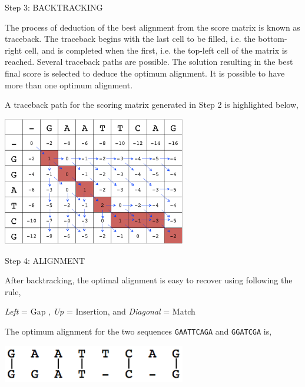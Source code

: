 \documentclass[a4paper,11pt]{article}
\begin{document}
\pagebreak

Step 3: BACKTRACKING

 The process of deduction of the best alignment from the score matrix is known as traceback. The traceback begins with the last cell to be filled, i.e. the bottom-right cell, and is completed when the first, i.e. the top-left cell of the matrix is reached. Several traceback paths are possible. The solution resulting in the best final score is selected to deduce the optimum alignment. It is possible to have more than one optimum alignment. 

A traceback path for the scoring matrix generated in Step 2 is highlighted below, 

\begin{center}
\includegraphics[width=0.6\textwidth]{backtracking.png}
\end{center}

Step 4: ALIGNMENT

After backtracking, the optimal alignment is easy to recover using following the rule,

 \emph{Left} = Gap , \emph{Up} = Insertion, and \emph{Diagonal} = Match 

The optimum alignment for the two sequences \texttt{GAATTCAGA} and \texttt{GGATCGA} is,\\

\begin{center}
\includegraphics[width=0.6\textwidth]{alignment.png}
\end{center}
\end{document}
